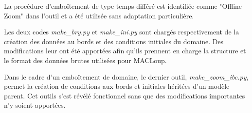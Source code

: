 \documentclass[10pt,a4paper,titlepage]{article}
\begin{document}
La procédure d’emboîtement de type temps-différé est identifiée comme "Offline Zoom" dans l'outil
et a été utilisée sans adaptation particulière.

Les deux codes \textit{make\_bry.py} et \textit{make\_ini.py} sont chargés respectivement de la création des données au bords et des conditions initiales du domaine.
Des modifications leur ont été apportées afin qu'ils prennent en charge la structure et le format des données brutes utilisées pour MACLoup.

Dans le cadre d'un emboîtement de domaine, le dernier outil, \textit{make\_zoom\_ibc.py}, permet la création de conditions aux bords et initiales héritées d'un modèle parent.
Cet outils s'est révélé fonctionnel sans que des modifications importantes n'y soient apportées.










\end{document}
